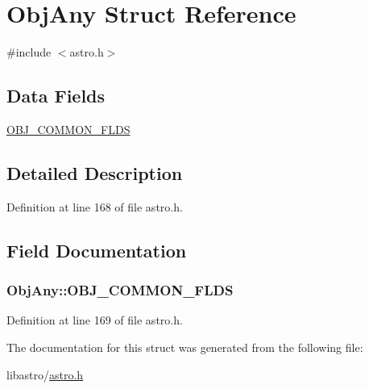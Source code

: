 \hypertarget{struct_obj_any}{\section{Obj\-Any Struct Reference}
\label{struct_obj_any}
}


{\ttfamily \#include $<$astro.\-h$>$}

\subsection*{Data Fields}
\begin{DoxyCompactItemize}
\item 
\hyperlink{struct_obj_any_a7f2257d4bcaa761474eebc5712819293}{O\-B\-J\-\_\-\-C\-O\-M\-M\-O\-N\-\_\-\-F\-L\-D\-S}
\end{DoxyCompactItemize}


\subsection{Detailed Description}


Definition at line 168 of file astro.\-h.



\subsection{Field Documentation}
\hypertarget{struct_obj_any_a7f2257d4bcaa761474eebc5712819293}{
\subsubsection[{O\-B\-J\-\_\-\-C\-O\-M\-M\-O\-N\-\_\-\-F\-L\-D\-S}]{\setlength{\rightskip}{0pt plus 5cm}Obj\-Any\-::\-O\-B\-J\-\_\-\-C\-O\-M\-M\-O\-N\-\_\-\-F\-L\-D\-S}}\label{struct_obj_any_a7f2257d4bcaa761474eebc5712819293}


Definition at line 169 of file astro.\-h.



The documentation for this struct was generated from the following file\-:\begin{DoxyCompactItemize}
\item 
libastro/\hyperlink{astro_8h}{astro.\-h}\end{DoxyCompactItemize}
